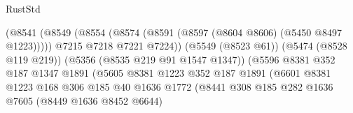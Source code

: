 \begin{lexlean}{RustStd}
\begin{coremodule}
                                                (@8541
                                                  (@8549
                                                    (@8554
                                                      (@8574
                                                        (@8591
                                                          (@8597
                                                            (@8604 @8606)
                                                            (@5450 @8497 @1223)))))
                                                    @7215
                                                    @7218
                                                    @7221
                                                    @7224))
                                                (@5549 (@8523 @61))
                                                (@5474 (@8528 @119 @219))
                                                (@5356 (@8535 @219 @91 @1547 @1347))
                                                (@5596
                                                  @8381
                                                  @352
                                                  @187
                                                  @1347
                                                  @1891
                                                  (@5605
                                                    @8381
                                                    @1223
                                                    @352
                                                    @187
                                                    @1891
                                                    (@6601
                                                      @8381
                                                      @1223
                                                      @168
                                                      @306
                                                      @185
                                                      @40
                                                      @1636
                                                      @1772
                                                      (@8441
                                                        @308
                                                        @185
                                                        @282
                                                        @1636
                                                        @7605
                                                        (@8449 @1636 @8452 @6644)

\end{coremodule}
\end{lexlean}
